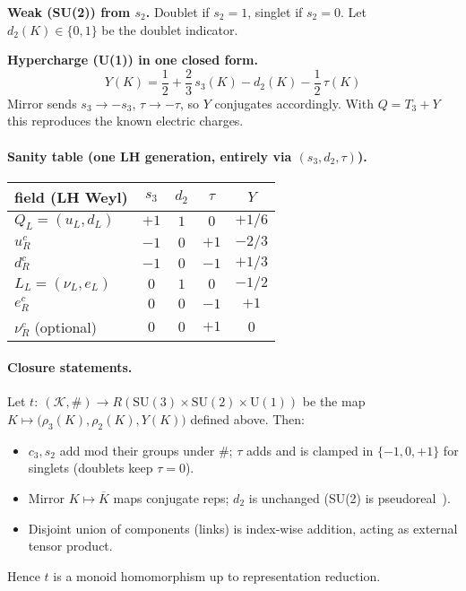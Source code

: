 \documentclass[11pt]{article}
\begin{document}
\noindent
\textbf{Weak (SU(2)) from $s_2$.}
Doublet if $s_2=1$, singlet if $s_2=0$. Let $d_2(K)\in\{0,1\}$ be the doublet indicator.
\smallskip

\noindent
\textbf{Hypercharge (U(1)) in one closed form.}
\[
	\boxed{\quad
	Y(K)=\frac{1}{2}+\frac{2}{3}\,s_3(K)-d_2(K)-\frac{1}{2}\,\tau(K)\quad}
\]
Mirror sends $s_3\to -s_3$, $\tau\to -\tau$, so $Y$ conjugates accordingly. With $Q=T_3+Y$ this reproduces the known electric charges.

\paragraph{Sanity table (one LH generation, entirely via $(s_3,d_2,\tau)$).}
\begin{center}\small
\begin{tabular}{lcccc}
	\toprule
	field (LH Weyl) & $s_3$ & $d_2$ & $\tau$ & $Y$ \\
	\midrule
	$Q_L=(u_L,d_L)$ & $+1$ & $1$ & $0$ & $+1/6$ \\
	$u_R^c$ & $-1$ & $0$ & $+1$ & $-2/3$ \\
	$d_R^c$ & $-1$ & $0$ & $-1$ & $+1/3$ \\
	$L_L=(\nu_L,e_L)$ & $0$ & $1$ & $0$ & $-1/2$ \\
	$e_R^c$ & $0$ & $0$ & $-1$ & $+1$ \\
	$\nu_R^c$ (optional) & $0$ & $0$ & $+1$ & $0$ \\
	\bottomrule
\end{tabular}
\end{center}

\paragraph{Closure statements.}
\begin{lemma}
	Let $t:\ (\mathcal{K},\#)\to R(\mathrm{SU}(3)\times\mathrm{SU}(2)\times\mathrm{U}(1))$ be the map $K\mapsto \big(\rho_3(K),\rho_2(K),Y(K)\big)$ defined above. Then:
	\begin{itemize}
		\item $c_3,s_2$ add mod their groups under $\#$; $\tau$ adds and is clamped in $\{-1,0,+1\}$ for singlets (doublets keep $\tau=0$).
		\item Mirror $K\mapsto\overline{K}$ maps conjugate reps; $d_2$ is unchanged (SU(2) is pseudoreal~\cite{Witten1982}).
		\item Disjoint union of components (links) is index-wise addition, acting as external tensor product.
	\end{itemize}
	Hence $t$ is a monoid homomorphism up to representation reduction.
\end{lemma}
\end{document}
